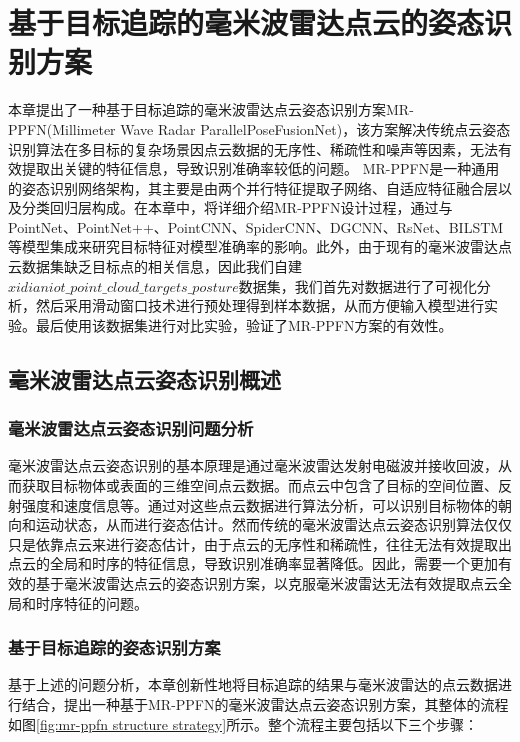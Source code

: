 \chapter{基于目标追踪的毫米波雷达点云的姿态识别方案}
本章提出了一种基于目标追踪的毫米波雷达点云姿态识别方案MR-PPFN(Millimeter Wave Radar ParallelPoseFusionNet)，该方案解决传统点云姿态识别算法在多目标的复杂场景因点云数据的无序性、稀疏性和噪声等因素，无法有效提取出关键的特征信息，导致识别准确率较低的问题。
MR-PPFN是一种通用的姿态识别网络架构，其主要是由两个并行特征提取子网络、自适应特征融合层以及分类回归层构成。在本章中，将详细介绍MR-PPFN设计过程，通过与PointNet、PointNet++、PointCNN、SpiderCNN、DGCNN、RsNet、BILSTM等模型集成来研究目标特征对模型准确率的影响。此外，由于现有的毫米波雷达点云数据集缺乏目标点的相关信息，因此我们自建$xidianiot\_point\_cloud\_targets\_posture$数据集，我们首先对数据进行了可视化分析，然后采用滑动窗口技术进行预处理得到样本数据，从而方便输入模型进行实验。最后使用该数据集进行对比实验，验证了MR-PPFN方案的有效性。
\section{毫米波雷达点云姿态识别概述}
\subsection{毫米波雷达点云姿态识别问题分析}
毫米波雷达点云姿态识别的基本原理是通过毫米波雷达发射电磁波并接收回波，从而获取目标物体或表面的三维空间点云数据。而点云中包含了目标的空间位置、反射强度和速度信息等。通过对这些点云数据进行算法分析，可以识别目标物体的朝向和运动状态，从而进行姿态估计。然而传统的毫米波雷达点云姿态识别算法仅仅只是依靠点云来进行姿态估计，由于点云的无序性和稀疏性，往往无法有效提取出点云的全局和时序的特征信息，导致识别准确率显著降低。因此，需要一个更加有效的基于毫米波雷达点云的姿态识别方案，以克服毫米波雷达无法有效提取点云全局和时序特征的问题。
\subsection{基于目标追踪的姿态识别方案}
基于上述的问题分析，本章创新性地将目标追踪的结果与毫米波雷达的点云数据进行结合，提出一种基于MR-PPFN的毫米波雷达点云姿态识别方案，其整体的流程如图\eqref{fig:mr-ppfn structure strategy}所示。整个流程主要包括以下三个步骤：


